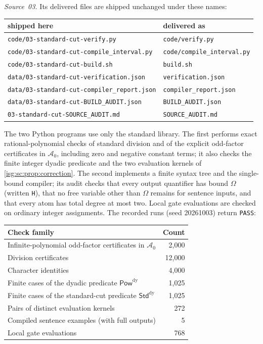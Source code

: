 \documentclass[11pt]{article}
\theoremstyle{definition}
\theoremstyle{remark}
\newcommand{\PowDy}{\mathsf{Pow}^{\mathrm{dy}}}
\newcommand{\StdDy}{\mathsf{Std}^{\mathrm{dy}}}
\newcommand{\Asc}{\mathcal{A}}
\newcommand{\fn}[1]{\nolinkurl{#1}}
\begin{document}
\emph{Source~03.} Its delivered files are shipped unchanged under these
names:
\begin{center}\small
\begin{tabular}{@{}ll@{}}
\toprule
shipped here & delivered as\\
\midrule
\fn{code/03-standard-cut-verify.py} & \fn{code/verify.py}\\
\fn{code/03-standard-cut-compile_interval.py} & \fn{code/compile_interval.py}\\
\fn{code/03-standard-cut-build.sh} & \fn{build.sh}\\
\fn{data/03-standard-cut-verification.json} & \fn{verification.json}\\
\fn{data/03-standard-cut-compiler_report.json} & \fn{compiler_report.json}\\
\fn{data/03-standard-cut-BUILD_AUDIT.json} & \fn{BUILD_AUDIT.json}\\
\fn{03-standard-cut-SOURCE_AUDIT.md} & \fn{SOURCE_AUDIT.md}\\
\bottomrule
\end{tabular}
\end{center}
The two Python programs use only the standard library. The first performs
exact rational-polynomial checks of standard division and of the explicit
odd-factor certificates in $\Asc_0$, including zero and negative constant
terms; it also checks the finite integer dyadic predicate and the two
evaluation kernels of \cref{isg:sc:prop:correction}. The second implements
a finite syntax tree and the single-bound compiler; its audit checks that
every output quantifier has bound $\Omega$ (written \texttt{H}), that no
free variable other than $\Omega$ remains for sentence inputs, and that
every atom has total degree at most two. Local gate evaluations are checked
on ordinary integer assignments. The recorded runs (seed 20261003) return
\texttt{PASS}:
\begin{center}\small
\begin{tabular}{@{}p{}r@{}}
\toprule
Check family & Count\\
\midrule
Infinite-polynomial odd-factor certificates in $\Asc_0$ & 2,000\\
Division certificates & 12,000\\
Character identities & 4,000\\
Finite cases of the dyadic predicate $\PowDy$ & 1,025\\
Finite cases of the standard-cut predicate $\StdDy$ & 1,025\\
Pairs of distinct evaluation kernels & 272\\
Compiled sentence examples (with full outputs) & 5\\
Local gate evaluations & 768\\
\bottomrule
\end{tabular}
\end{center}
\end{document}
